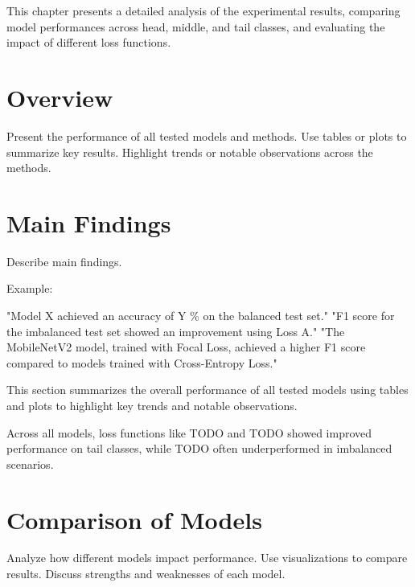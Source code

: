 This chapter presents a detailed analysis of the experimental results, comparing model performances across head, middle, and tail classes, and evaluating the impact of different loss functions.

\section{Overview}
Present the performance of all tested models and methods.
Use tables or plots to summarize key results.
Highlight trends or notable observations across the methods.

\section{Main Findings}

Describe main findings.

Example:

"Model X achieved an accuracy of Y \% on the balanced test set."
"F1 score for the imbalanced test set showed an improvement using Loss A."
"The MobileNetV2 model, trained with Focal Loss, achieved a higher F1 score compared to models trained with Cross-Entropy Loss."

This section summarizes the overall performance of all tested models using tables and plots to highlight key trends and notable observations.

Across all models, loss functions like TODO and TODO showed improved performance on tail classes, while TODO often underperformed in imbalanced scenarios.

\section{Comparison of Models}
Analyze how different models impact performance.
Use visualizations to compare results.
Discuss strengths and weaknesses of each model.

